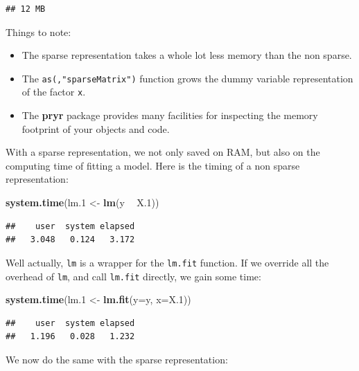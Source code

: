 \documentclass[]{book}
\newenvironment{Shaded}{\begin{snugshade}}{\end{snugshade}}
\newcommand{\KeywordTok}[1]{\textcolor[rgb]{0.13,0.29,0.53}{\textbf{#1}}}
\newcommand{\DataTypeTok}[1]{\textcolor[rgb]{0.13,0.29,0.53}{#1}}
\newcommand{\DecValTok}[1]{\textcolor[rgb]{0.00,0.00,0.81}{#1}}
\newcommand{\StringTok}[1]{\textcolor[rgb]{0.31,0.60,0.02}{#1}}
\newcommand{\OperatorTok}[1]{\textcolor[rgb]{0.81,0.36,0.00}{\textbf{#1}}}
\newcommand{\NormalTok}[1]{#1}
\providecommand{\tightlist}{%
  \setlength{\itemsep}{0pt}\setlength{\parskip}{0pt}}
\theoremstyle{definition}
\theoremstyle{definition}
\theoremstyle{definition}
\theoremstyle{remark}
\begin{document}
\begin{verbatim}
## 12 MB
\end{verbatim}

Things to note:

\begin{itemize}
\tightlist
\item
  The sparse representation takes a whole lot less memory than the non
  sparse.
\item
  The \texttt{as(,"sparseMatrix")} function grows the dummy variable
  representation of the factor \texttt{x}.
\item
  The \textbf{pryr} package provides many facilities for inspecting the
  memory footprint of your objects and code.
\end{itemize}

With a sparse representation, we not only saved on RAM, but also on the
computing time of fitting a model. Here is the timing of a non sparse
representation:

\begin{Shaded}
\begin{Highlighting}[]
\KeywordTok{system.time}\NormalTok{(lm.}\DecValTok{1}\NormalTok{ <-}\StringTok{ }\KeywordTok{lm}\NormalTok{(y }\OperatorTok{~}\StringTok{ }\NormalTok{X.}\DecValTok{1}\NormalTok{)) }
\end{Highlighting}
\end{Shaded}

\begin{verbatim}
##    user  system elapsed 
##   3.048   0.124   3.172
\end{verbatim}

Well actually, \texttt{lm} is a wrapper for the \texttt{lm.fit}
function. If we override all the overhead of \texttt{lm}, and call
\texttt{lm.fit} directly, we gain some time:

\begin{Shaded}
\begin{Highlighting}[]
\KeywordTok{system.time}\NormalTok{(lm.}\DecValTok{1}\NormalTok{ <-}\StringTok{ }\KeywordTok{lm.fit}\NormalTok{(}\DataTypeTok{y=}\NormalTok{y, }\DataTypeTok{x=}\NormalTok{X.}\DecValTok{1}\NormalTok{))}
\end{Highlighting}
\end{Shaded}

\begin{verbatim}
##    user  system elapsed 
##   1.196   0.028   1.232
\end{verbatim}

We now do the same with the sparse representation:
\end{document}
